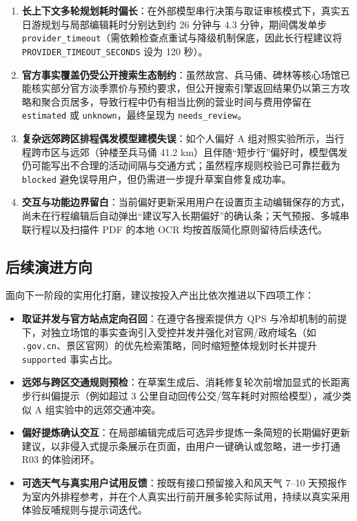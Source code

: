 \begin{enumerate}
  \item \textbf{长上下文多轮规划耗时偏长}：在外部模型串行决策与取证审核模式下，真实五日游规划与局部编辑耗时分别达到约 26 分钟与 4.3 分钟，期间偶发单步 \texttt{provider\_timeout}（需依赖检查点重试与降级机制保底，因此长行程建议将 \texttt{PROVIDER\_TIMEOUT\_SECONDS} 设为 120 秒）。
  \item \textbf{官方事实覆盖仍受公开搜索生态制约}：虽然故宫、兵马俑、碑林等核心场馆已能核实部分官方淡季票价与预约要求，但公开搜索引擎返回结果仍以第三方攻略和聚合页居多，导致行程中仍有相当比例的营业时间与费用停留在 \texttt{estimated} 或 \texttt{unknown}，最终呈现为 \texttt{needs\_review}。
  \item \textbf{复杂远郊跨区排程偶发模型建模失误}：如个人偏好 A 组对照实验所示，当行程跨市区与远郊（钟楼至兵马俑 41.2 km）且伴随“短步行”偏好时，模型偶发仍可能写出不合理的活动间隔与交通方式；虽然程序规则校验已可靠拦截为 \texttt{blocked} 避免误导用户，但仍需进一步提升草案自修复成功率。
  \item \textbf{交互与功能边界留白}：当前偏好更新采用用户在设置页主动编辑保存的方式，尚未在行程编辑后自动弹出“建议写入长期偏好”的确认条；天气预报、多城串联行程以及扫描件 PDF 的本地 OCR 均按首版简化原则留待后续迭代。
\end{enumerate}

\subsection{后续演进方向}

面向下一阶段的实用化打磨，建议按投入产出比依次推进以下四项工作：

\begin{itemize}
  \item \textbf{取证并发与官方站点定向召回}：在遵守各搜索提供方 QPS 与冷却机制的前提下，对独立场馆的事实查询引入受控并发并强化对官网/政府域名（如 \texttt{.gov.cn}、景区官网）的优先检索策略，同时缩短整体规划时长并提升 \texttt{supported} 事实占比。
  \item \textbf{远郊与跨区交通规则预检}：在草案生成后、消耗修复轮次前增加显式的长距离步行纠偏提示（例如超过 3 公里自动回传公交/驾车耗时对照给模型），减少类似 A 组实验中的远郊交通冲突。
  \item \textbf{偏好提炼确认交互}：在局部编辑完成后可选异步提炼一条简短的长期偏好更新建议，以非侵入式提示条展示在页面，由用户一键确认或忽略，进一步打通 R03 的体验闭环。
  \item \textbf{可选天气与真实用户试用反馈}：按既有接口预留接入和风天气 7--10 天预报作为室内外排程参考，并在个人真实出行前开展多轮实际试用，持续以真实采用体验反哺规则与提示词迭代。
\end{itemize}
